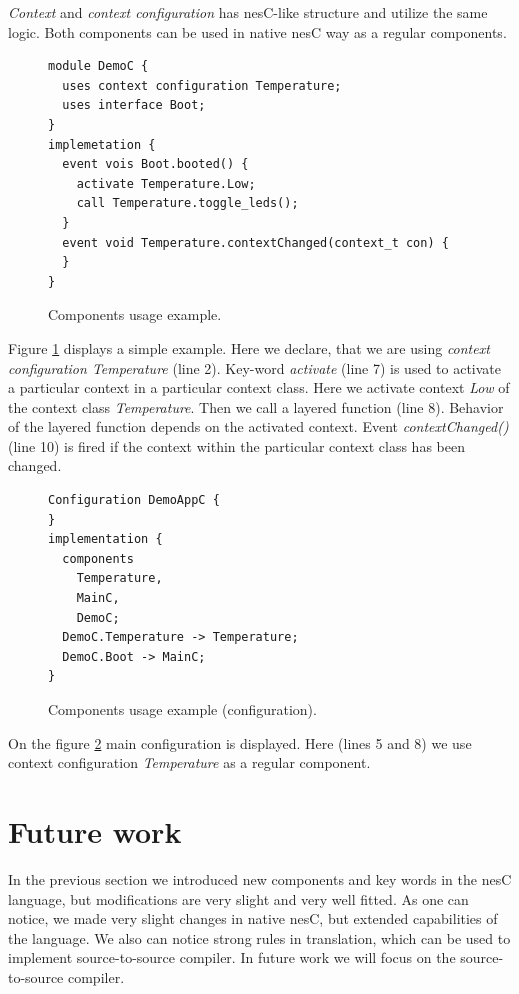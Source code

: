 \documentclass{ubicomp-ext}
\begin{document}
\textit{Context} and \textit{context configuration} has nesC-like structure and utilize the same logic. Both components can be used in native nesC way as a regular components.

\begin{figure}
\begin{lstlisting}
module DemoC {
  uses context configuration Temperature;
  uses interface Boot;
}
implemetation {
  event vois Boot.booted() {
    activate Temperature.Low;
    call Temperature.toggle_leds();
  }
  event void Temperature.contextChanged(context_t con) {
  }
}
\end{lstlisting}
\caption{Components usage example.}
\label{fig:cue}
\end{figure}

Figure \ref{fig:cue} displays a simple example. Here we declare, that we are using \textit{context configuration Temperature} (line 2). Key-word \textit{activate} (line 7) is used to activate a particular context in a particular context class. Here we activate context \textit{Low} of the context class \textit{Temperature}. Then we call a layered function (line 8). Behavior of the layered function depends on the activated context. Event \textit{contextChanged()} (line 10) is fired if the context within the particular context class has been changed.

\begin{figure}
\begin{lstlisting}
Configuration DemoAppC {
}
implementation {
  components
    Temperature,
    MainC,
    DemoC;
  DemoC.Temperature -> Temperature;
  DemoC.Boot -> MainC;
}
\end{lstlisting}
\caption{Components usage example (configuration).}
\label{fig:cuec}
\end{figure}

On the figure \ref{fig:cuec} main configuration is displayed. Here (lines 5 and 8) we use context configuration \textit{Temperature} as a regular component.

\section{Future work}
In the previous section we introduced new components and key words in the nesC language, but modifications are very slight and very well fitted. As one can notice, we made very slight changes in native nesC, but extended capabilities of the language. We also can notice strong rules in translation, which can be used to implement source-to-source compiler. In future work we will focus on the source-to-source compiler.
\end{document}
